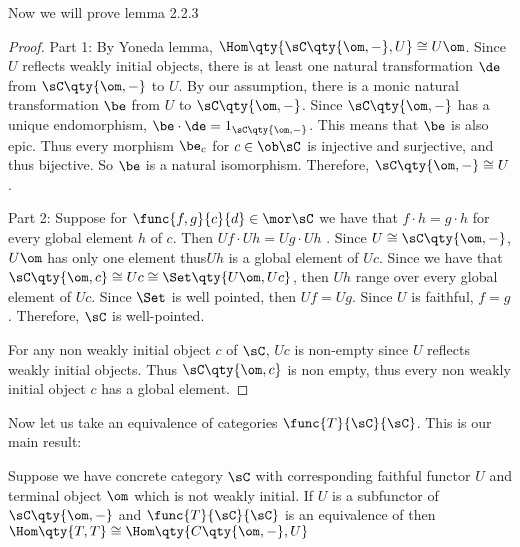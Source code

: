 \documentclass[main.tex]{subfiles}
\begin{document}
Now we will prove lemma 2.2.3

\begin{proof}
	Part 1:
	By Yoneda lemma, $\Hom\qty{\sC\qty{\om,-},U} \cong U\om$. Since $U$ reflects
	weakly initial objects, there is at least one natural transformation $\de$
	from $\sC\qty{\om,-}$ to $U$. By our assumption, there is a monic natural
	transformation $\be$ from $U$ to $\sC\qty{\om,-}$. Since $\sC\qty{\om,-}$
	has a unique endomorphism, $\be \cdot \de = 1_{\sC\qty{\om,-}}$. This means
	that $\be$ is also epic. Thus every morphism $\be_{c}$ for $c \in \ob \sC$
	is injective and surjective, and thus bijective. So $\be$ is a natural
	isomorphism. Therefore, $\sC\qty{\om,-} \cong U$.

	Part 2: Suppose for $\func{f,g}{c}{d} \in \mor \sC$ we have that $f \cdot h
	= g \cdot h$ for every global element $h$ of $c$. Then $Uf \cdot Uh = Ug
	\cdot Uh$ .  Since $U \cong \sC\qty{\om,-}$,$U\om$ has only one element
	thus$Uh$ is a global element of $Uc$. Since we have that $\sC\qty{\om,c}
	\cong Uc \cong \Set\qty{U\om,Uc}$, then $Uh$ range over every global element
	of $Uc$. Since $\Set$ is well pointed, then $Uf = Ug$. Since $U$ is
	faithful, $f = g$. Therefore, $\sC$ is well-pointed.

	For any non weakly initial object $c$ of $\sC$, $Uc$ is non-empty since $U$
	reflects weakly initial objects. Thus $\sC\qty{\om,c}$ is non empty, thus
	every non weakly initial object $c$ has a global element.
\end{proof}

Now let us take an equivalence of categories $\func{T}{\sC}{\sC}$. This is our main result:

\begin{theorem}
	Suppose we have concrete category $\sC$ with corresponding faithful functor
	$U$ and terminal object $\om$ which is not weakly initial. If $U $ is a
	subfunctor of  $\sC\qty{\om,-}$ and $\func{T}{\sC}{\sC}$ is an equivalence
	of  then $\Hom\qty{T,T} \cong \Hom\qty{C\qty{\om,-},U }$
\end{theorem}
\end{document}
